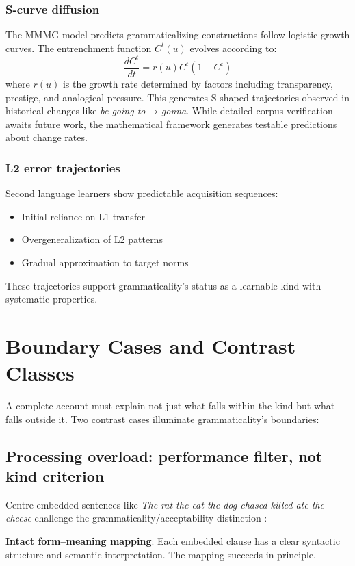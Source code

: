 \documentclass[12pt]{article}
\begin{document}
\subsubsection{S-curve diffusion}

The MMMG model predicts grammaticalizing constructions follow logistic growth curves. The entrenchment function $C^t(u)$ evolves according to:
$$\frac{dC^t}{dt} = r(u)C^t(1-C^t)$$
where $r(u)$ is the growth rate determined by factors including transparency, prestige, and analogical pressure. This generates S-shaped trajectories observed in historical changes like \textit{be going to} → \textit{gonna}. While detailed corpus verification awaits future work, the mathematical framework generates testable predictions about change rates.

\subsubsection{L2 error trajectories}

Second language learners show predictable acquisition sequences:
\begin{itemize}
    \item Initial reliance on L1 transfer
    \item Overgeneralization of L2 patterns  
    \item Gradual approximation to target norms
\end{itemize}
These trajectories support grammaticality's status as a learnable kind with systematic properties.

\section{Boundary Cases and Contrast Classes}

A complete account must explain not just what falls within the kind but what falls outside it. Two contrast cases illuminate grammaticality's boundaries:

\subsection{Processing overload: performance filter, not kind criterion}

Centre-embedded sentences like \textit{The rat the cat the dog chased killed ate the cheese} challenge the grammaticality/acceptability distinction \parencite[see esp. \S\S 2.2.7--2.2.8]{Gibson2024}:

\textbf{Intact form--meaning mapping}: Each embedded clause has a clear syntactic structure and semantic interpretation. The mapping succeeds in principle.
\end{document}
